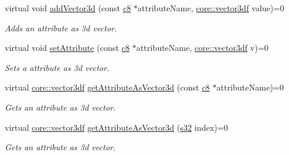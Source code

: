 \begin{DoxyCompactItemize}
\mbox{\label{classirr_1_1io_1_1IAttributes_aee73f5e51ad978b2bf146d10725da72f}} 
virtual void \hyperlink{classirr_1_1io_1_1IAttributes_aee73f5e51ad978b2bf146d10725da72f}{add\+Vector3d} (const \hyperlink{namespaceirr_a9395eaea339bcb546b319e9c96bf7410}{c8} $\ast$attribute\+Name, \hyperlink{namespaceirr_1_1core_ae6e2b2a6c552833ebbd5b7463d03586b}{core\+::vector3df} value)=0
\begin{DoxyCompactList}\small\item\em Adds an attribute as 3d vector. \end{DoxyCompactList}\item 
\mbox{\label{classirr_1_1io_1_1IAttributes_ac08a589c89febec76cfd942fad0bb519}} 
virtual void \hyperlink{classirr_1_1io_1_1IAttributes_ac08a589c89febec76cfd942fad0bb519}{set\+Attribute} (const \hyperlink{namespaceirr_a9395eaea339bcb546b319e9c96bf7410}{c8} $\ast$attribute\+Name, \hyperlink{namespaceirr_1_1core_ae6e2b2a6c552833ebbd5b7463d03586b}{core\+::vector3df} v)=0
\begin{DoxyCompactList}\small\item\em Sets a attribute as 3d vector. \end{DoxyCompactList}\item 
virtual \hyperlink{namespaceirr_1_1core_ae6e2b2a6c552833ebbd5b7463d03586b}{core\+::vector3df} \hyperlink{classirr_1_1io_1_1IAttributes_ac4ad5d4db7fd08e0523d3f8e671c2f68}{get\+Attribute\+As\+Vector3d} (const \hyperlink{namespaceirr_a9395eaea339bcb546b319e9c96bf7410}{c8} $\ast$attribute\+Name)=0
\begin{DoxyCompactList}\small\item\em Gets an attribute as 3d vector. \end{DoxyCompactList}\item 
virtual \hyperlink{namespaceirr_1_1core_ae6e2b2a6c552833ebbd5b7463d03586b}{core\+::vector3df} \hyperlink{classirr_1_1io_1_1IAttributes_a7ff94072381cac9912d73c9c6c77c6ce}{get\+Attribute\+As\+Vector3d} (\hyperlink{namespaceirr_ac66849b7a6ed16e30ebede579f9b47c6}{s32} index)=0
\begin{DoxyCompactList}\small\item\em Gets an attribute as 3d vector. \end{DoxyCompactList}\item 
\mbox{\label{classirr_1_1io_1_1IAttributes_ac042bda6760e9adcfd967b0046d55d20}} 

\end{DoxyCompactItemize}
